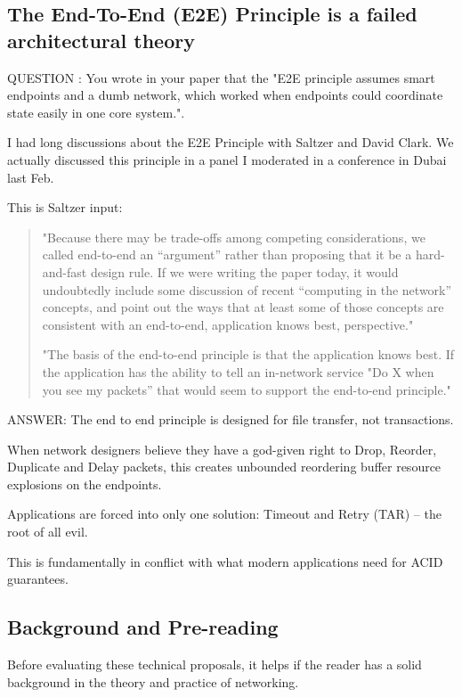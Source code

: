 \subsection{The End-To-End (E2E) Principle is a failed architectural theory}

QUESTION : You wrote in your paper that the "E2E principle assumes smart endpoints and a dumb network, which worked when endpoints could coordinate state easily in one core system.".

I had long discussions about the E2E Principle with Saltzer and David Clark. We actually discussed this principle in a panel I moderated in a conference in Dubai last Feb. 

This is Saltzer input:
\begin{quotation}
"Because there may be trade-offs among competing considerations, we called end-to-end an “argument” rather than proposing that it be a hard-and-fast design rule. If we were writing the paper today, it would undoubtedly include some discussion of recent “computing in the network” concepts, and point out the ways that at least some of those concepts are consistent with an end-to-end, application knows best, perspective."

"The basis of the end-to-end principle is that the application knows best.  If the application has the ability to tell an in-network service "Do X when you see my packets” that would seem to support the end-to-end principle."
\end{quotation}


\noindent ANSWER: The end to end principle is designed for file transfer, not transactions. 

When network designers believe they have a god-given right to Drop, Reorder, Duplicate and Delay packets, this creates  unbounded reordering buffer resource explosions on the endpoints.  

Applications are forced into only one solution: Timeout and Retry (TAR) --  the root of all evil.

This is fundamentally in conflict with what modern applications need for ACID guarantees.

\subsection{Background and Pre-reading}

Before evaluating these technical proposals, it helps if the reader has a solid background in the theory and practice of networking.

